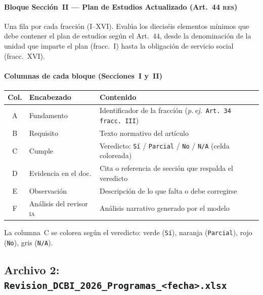\documentclass[11pt,a4paper]{article}
\newcommand{\RES}{\textsc{res}}
\newcommand{\IA}{\textsc{ia}}
\begin{document}
\paragraph{Bloque Sección~II --- Plan de Estudios Actualizado (Art.\ 44 \RES{})}

Una fila por cada fracción (I--XVI). Evalúa los dieciséis elementos mínimos
que debe contener el plan de estudios según el Art.\ 44, desde la denominación
de la unidad que imparte el plan (fracc.\ I) hasta la obligación de servicio social
(fracc.\ XVI).

\paragraph{Columnas de cada bloque (Secciones~I y~II)}

\begin{center}
\begin{tabular}{clp{7.5cm}}
\toprule
\textbf{Col.} & \textbf{Encabezado} & \textbf{Contenido} \\
\midrule
A & Fundamento          & Identificador de la fracción
                          (\textit{p.\,ej.}\ \texttt{Art.\ 34 fracc.\ III}) \\
B & Requisito           & Texto normativo del artículo \\
C & Cumple              & Veredicto: \texttt{Sí} / \texttt{Parcial} / \texttt{No}
                          / \texttt{N/A} (celda coloreada) \\
D & Evidencia en el doc.& Cita o referencia de sección que respalda el veredicto \\
E & Observación         & Descripción de lo que falta o debe corregirse \\
F & Análisis del revisor \IA{} & Análisis narrativo generado por el modelo \\
\bottomrule
\end{tabular}
\end{center}

\begin{okbox}
La columna~C se colorea según el veredicto: verde (\texttt{Sí}),
naranja (\texttt{Parcial}), rojo (\texttt{No}), gris (\texttt{N/A}).
\end{okbox}

\subsection{Archivo 2: \texttt{Revision\_DCBI\_2026\_Programas\_<fecha>.xlsx}}
\end{document}
